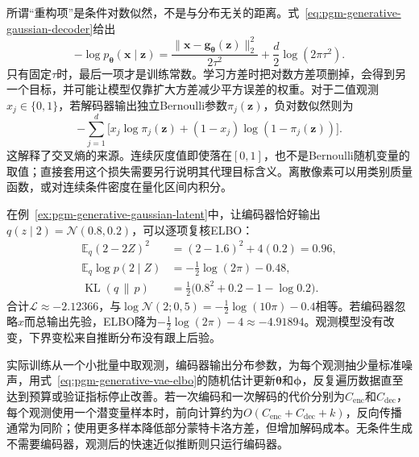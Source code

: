 所谓“重构项”是条件对数似然，不是与分布无关的距离。式~\eqref{eq:pgm-generative-gaussian-decoder}给出
\begin{equation}
  \label{eq:pgm-generative-reconstruction}
  -\log p_{\bm{\theta}}(\bm{x}\mid\bm{z})
  =\frac{\lVert\bm{x}-\bm{g}_{\bm{\theta}}(\bm{z})\rVert_2^2}
          {2\tau^2}
    +\frac{d}{2}\log(2\pi\tau^2).
\end{equation}
只有固定$\tau$时，最后一项才是训练常数。学习方差时把对数方差项删掉，会得到另一个目标，并可能让模型仅靠扩大方差减少平方误差的权重。对于二值观测$x_j\in\{0,1\}$，若解码器输出独立Bernoulli参数$\pi_j(\bm{z})$，负对数似然则为
\[
  -\sum_{j=1}^{d}
    \bigl[x_j\log\pi_j(\bm{z})
      +(1-x_j)\log(1-\pi_j(\bm{z}))\bigr].
\]
这解释了交叉熵的来源。连续灰度值即使落在$[0,1]$，也不是Bernoulli随机变量的取值；直接套用这个损失需要另行说明其代理目标含义。离散像素可以用类别质量函数，或对连续条件密度在量化区间内积分。

在例~\ref{ex:pgm-generative-gaussian-latent}中，让编码器恰好输出$q(z\mid2)=\mathcal{N}(0.8,0.2)$，可以逐项复核ELBO：
\[
  \begin{aligned}
    \mathbb{E}_{q}(2-2Z)^2&=(2-1.6)^2+4(0.2)=0.96,\\
    \mathbb{E}_{q}\log p(2\mid Z)&=-\tfrac12\log(2\pi)-0.48,\\
    \operatorname{KL}(q\,\|\,p)&=
       \tfrac12\bigl(0.8^2+0.2-1-\log0.2\bigr).
  \end{aligned}
\]
合计$\mathcal{L}\approx-2.12366$，与$\log\mathcal{N}(2;0,5)=-\tfrac12\log(10\pi)-0.4$相等。若编码器忽略$x$而总输出先验，ELBO降为$-\tfrac12\log(2\pi)-4\approx-4.91894$。观测模型没有改变，下界变松来自推断分布没有跟上后验。

实际训练从一个小批量中取观测，编码器输出分布参数，为每个观测抽少量标准噪声，用式~\eqref{eq:pgm-generative-vae-elbo}的随机估计更新$\bm{\theta}$和$\bm{\phi}$，反复遍历数据直至达到预算或验证指标停止改善。若一次编码和一次解码的代价分别为$C_{\mathrm{enc}}$和$C_{\mathrm{dec}}$，每个观测使用一个潜变量样本时，前向计算约为$O(C_{\mathrm{enc}}+C_{\mathrm{dec}}+k)$，反向传播通常为同阶；使用更多样本降低部分蒙特卡洛方差，但增加解码成本。无条件生成不需要编码器，观测后的快速近似推断则只运行编码器。

